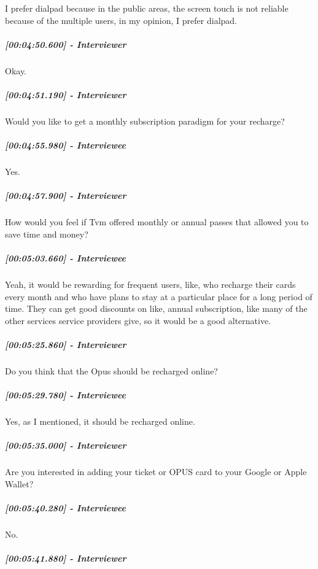 \documentclass[a4paper,12pt]{article}
\begin{document}
I prefer dialpad because in the public areas, the screen touch is not
reliable because of the multiple users, in my opinion, I prefer dialpad.

\hypertarget{interviewer-34}{%
\subparagraph{{[}00:04:50.600{]} - Interviewer}\label{interviewer-34}}

Okay.

\hypertarget{interviewer-35}{%
\subparagraph{{[}00:04:51.190{]} - Interviewer}\label{interviewer-35}}

Would you like to get a monthly subscription paradigm for your recharge?

\hypertarget{interviewee-23}{%
\subparagraph{{[}00:04:55.980{]} - Interviewee}\label{interviewee-23}}

Yes.

\hypertarget{interviewer-36}{%
\subparagraph{{[}00:04:57.900{]} - Interviewer}\label{interviewer-36}}

How would you feel if Tvm offered monthly or annual passes that allowed
you to save time and money?

\hypertarget{interviewee-24}{%
\subparagraph{{[}00:05:03.660{]} - Interviewee}\label{interviewee-24}}

Yeah, it would be rewarding for frequent users, like, who recharge their
cards every month and who have plans to stay at a particular place for a
long period of time. They can get good discounts on like, annual
subscription, like many of the other services service providers give, so
it would be a good alternative.

\hypertarget{interviewer-37}{%
\subparagraph{{[}00:05:25.860{]} - Interviewer}\label{interviewer-37}}

Do you think that the Opus should be recharged online?

\hypertarget{interviewee-25}{%
\subparagraph{{[}00:05:29.780{]} - Interviewee}\label{interviewee-25}}

Yes, as I mentioned, it should be recharged online.

\hypertarget{interviewer-38}{%
\subparagraph{{[}00:05:35.000{]} - Interviewer}\label{interviewer-38}}

Are you interested in adding your ticket or OPUS card to your Google or
Apple Wallet?

\hypertarget{interviewee-26}{%
\subparagraph{{[}00:05:40.280{]} - Interviewee}\label{interviewee-26}}

No.

\hypertarget{interviewer-39}{%
\subparagraph{{[}00:05:41.880{]} - Interviewer}\label{interviewer-39}}
\end{document}
